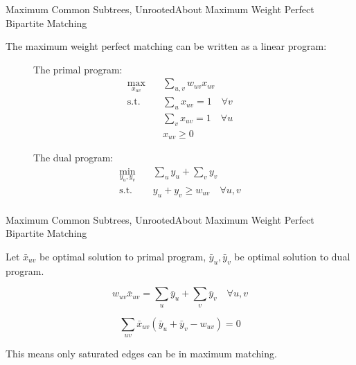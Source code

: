 \documentclass{beamer}
\begin{document}
\begin{frame}{Maximum Common Subtrees, Unrooted}{About Maximum Weight Perfect Bipartite Matching}

The maximum weight perfect matching can be written as a linear program:

\begin{figure}
\centering
\begin{minipage}{0.45\linewidth}
	The primal program:
\begin{align*}
\max_{x_{uv}} \quad & \sum_{u,v} w_{uv} x_{uv} \\
\text{s.t.} \quad & \sum_{u} x_{uv} = 1 \quad \forall v \\
& \sum_{v} x_{uv} = 1 \quad \forall u \\
& x_{uv} \geq 0
\end{align*}
\end{minipage}
\pause
\begin{minipage}{0.45\linewidth}
	The dual program:
\begin{align*}
\min_{y_u, y_v} \quad & \sum_u y_u + \sum_v y_v \\
\text{s.t.} \quad & y_u + y_v \geq w_{uv} \quad \forall u, v \\
\end{align*}
\end{minipage}
\end{figure}

\end{frame}

\begin{frame}{Maximum Common Subtrees, Unrooted}{About Maximum Weight Perfect Bipartite Matching}

Let $\bar{x}_{uv}$ be optimal solution to primal program, $\bar{y}_u, \bar{y}_v$ be optimal solution to dual program.

\begin{theorem}
$$w_{uv} \bar{x}_{uv} = \sum_u \bar{y}_u + \sum_v \bar{y}_v \quad \forall u, v$$
\end{theorem}

\pause

\begin{theorem}
$$
\sum_{uv} \bar{x}_{uv} (\bar{y}_u + \bar{y}_v - w_{uv}) = 0
$$	

This means only saturated edges can be in maximum matching.
\end{theorem}

\end{frame}
\end{document}
